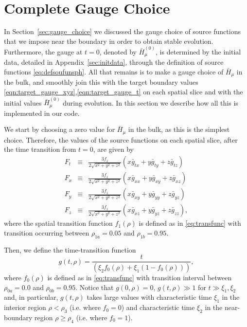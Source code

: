 \documentclass[a4paper,11pt]{article}
\begin{document}
\section{Complete Gauge Choice}
\label{sec:GCbulk}

In Section~\ref{sec:gauge_choice} we discussed the gauge choice of source functions that we impose near the boundary in order to obtain stable evolution. Furthermore, the gauge at $t=0$, denoted by $\bar{H}_{\mu}^{(0)}$, is determined by the initial data, detailed in Appendix~\ref{sec:initdata}, through the definition of source functions \eqref{eq:defsoufunsph}. All that remains is to make a gauge choice of $\bar{H}_\mu$ in the bulk, and smoothly join this with the target boundary values \ref{eqn:target_gauge_xyz},\ref{eqn:target_gauge_t} on each spatial slice and with the initial values $\bar{H}_{\mu}^{(0)}$ during evolution. In this section we describe how all this is implemented in our code.

We start by choosing a zero value for $\bar{H}_\mu$ in the bulk, as this is the simplest choice. Therefore, the values of the source functions on each spatial slice, after the time transition from $t=0$, are given by
\begin{eqnarray}
\label{eqn:extend_gauge_txyz}
F_t&\equiv&\frac{3f_1}{2\sqrt{x^2+y^2+z^2}}(x \bar{g}_{tx}+y\bar{g}_{ty}+z\bar{g}_{tz}) \nonumber \\
F_x&\equiv&\frac{3f_1}{2\sqrt{x^2+y^2+z^2}}(x \bar{g}_{xx}+y\bar{g}_{xy}+z\bar{g}_{xz}) \nonumber \\
F_y&\equiv&\frac{3f_1}{2\sqrt{x^2+y^2+z^2}}(x \bar{g}_{xy}+y\bar{g}_{yy}+z\bar{g}_{yz}) \nonumber \\
F_z&\equiv&\frac{3f_1}{2\sqrt{x^2+y^2+z^2}}(x \bar{g}_{xz}+y\bar{g}_{yz}+z\bar{g}_{zz}),
\end{eqnarray}
where the spatial transition function $f_1(\rho)$ is defined as in \eqref{eq:transfunc} with transition occurring between $\rho_{1a}=0.05$ and $\rho_{1b}=0.95$.

Then, we define the time-transition function
\begin{equation}
g(t,\rho)=\frac{t}{(\xi_2 f_0(\rho)+\xi_1(1-f_0(\rho)))},
\end{equation}
where $f_0(\rho)$ is defined as in \eqref{eq:transfunc} with transition interval between $\rho_{0a}=0.0$ and $\rho_{0b}=0.95$. Notice that $g(0,\rho)=0$, $g(t,\rho)\gg 1$ for $t\gg\xi_1,\xi_2$ and, in particular, $g(t,\rho)$ takes large values with characteristic time $\xi_1$ in the interior region $\rho<\rho_3$ (i.e. where $f_0=0$) and characteristic time $\xi_2$ in the near-boundary region $\rho\geq\rho_4$ (i.e. where $f_0=1$).
\end{document}

